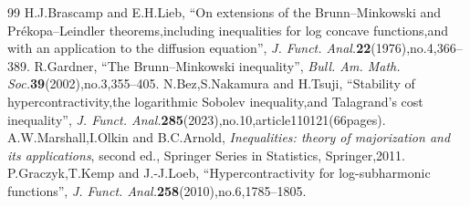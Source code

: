 \documentclass[10pt,a4paper]{amsart}
\theoremstyle{definition}\newtheorem{defi}[theo]{Definition}
\begin{document}
\begin{thebibliography}{99}
 H.J.Brascamp and E.H.Lieb, ``On extensions of the Brunn--Minkowski and Prékopa--Leindler theorems,including inequalities for log concave functions,and with an application to the diffusion equation'', \emph{J. Funct. Anal.}\textbf{22}(1976),no.4,366--389.
 R.Gardner, ``The Brunn--Minkowski inequality'', \emph{Bull. Am. Math. Soc.}\textbf{39}(2002),no.3,355--405.
 N.Bez,S.Nakamura and H.Tsuji, ``Stability of hypercontractivity,the logarithmic Sobolev inequality,and Talagrand's cost inequality'', \emph{J. Funct. Anal.}\textbf{285}(2023),no.10,article110121(66pages).
 A.W.Marshall,I.Olkin and B.C.Arnold, \emph{Inequalities: theory of majorization and its applications}, second ed., Springer Series in Statistics, Springer,2011.
 P.Graczyk,T.Kemp and J.-J.Loeb, ``Hypercontractivity for log-subharmonic functions'', \emph{J. Funct. Anal.}\textbf{258}(2010),no.6,1785--1805.
\end{thebibliography}
\end{document}
